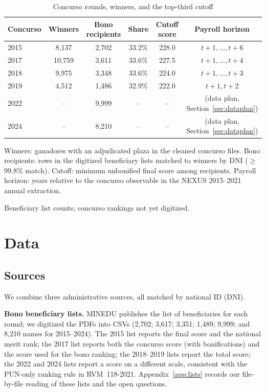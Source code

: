 \documentclass[11pt]{article}
\begin{document}
\begin{table}[htbp]
\centering
\caption{Concurso rounds, winners, and the top-third cutoff}
\label{tab:rounds}
\begin{threeparttable}
\begin{tabular}{lccccc}
\toprule
Concurso & Winners & Bono recipients & Share & Cutoff score & Payroll horizon \\
\midrule
2015 & 8,137  & 2,702 & 33.2\% & 228.0 & $t+1,\dots,t+6$ \\
2017 & 10,759 & 3,611 & 33.6\% & 227.5 & $t+1,\dots,t+4$ \\
2018 & 9,975  & 3,348 & 33.6\% & 224.0 & $t+1,\dots,t+3$ \\
2019 & 4,512  & 1,486 & 32.9\% & 222.0 & $t+1,t+2$ \\
2022 & --     & 9,999\tnote{a} & -- & -- & (data plan, Section~\ref{sec:dataplan}) \\
2024 & --     & 8,210\tnote{a} & -- & -- & (data plan, Section~\ref{sec:dataplan}) \\
\bottomrule
\end{tabular}
\begin{tablenotes}\footnotesize
\item Winners: ganadores with an adjudicated plaza in the cleaned concurso
files. Bono recipients: rows in the digitized beneficiary lists matched to
winners by DNI ($\geq$99.8\% match). Cutoff: minimum unbonified final score
among recipients. Payroll horizon: years relative to the concurso observable
in the NEXUS 2015--2021 annual extraction.
\item[a] Beneficiary list counts; concurso rankings not yet digitized.
\end{tablenotes}
\end{threeparttable}
\end{table}

\section{Data}\label{sec:data}

\subsection{Sources}

We combine three administrative sources, all matched by national ID (DNI).

\textbf{Bono beneficiary lists.} MINEDU publishes the list of beneficiaries
for each round; we digitized the PDFs into CSVs (2,702; 3,617; 3,351; 1,489;
9,999; and 8,210 names for 2015--2024). The 2015 list reports the final score
and the national merit rank; the 2017 list reports both the concurso score
(with bonifications) and the score used for the bono ranking; the 2018--2019
lists report the total score; the 2022 and 2024 lists report a score on a
different scale, consistent with the PUN-only ranking rule in
RVM~118-2021. Appendix~\ref{app:lists} records our file-by-file reading of
these lists and the open questions.
\end{document}
